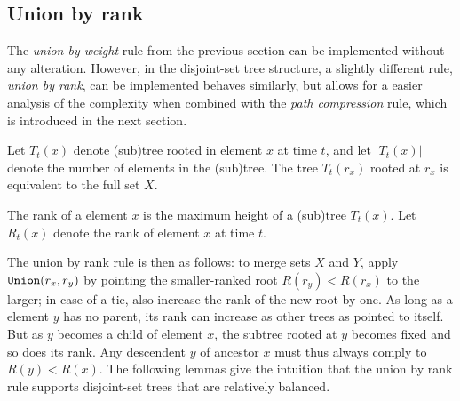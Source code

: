 \subsection{Union by rank}
The \emph{union by weight} rule from the previous section can be implemented without any alteration. However, in the disjoint-set tree structure, a slightly different rule, \emph{union by rank}, can be implemented behaves similarly, but allows for a easier analysis of the complexity when combined with the \emph{path compression} rule, which is introduced in the next section. 

\begin{definition}\label{def:tree}
  Let $T_t(x)$ denote (sub)tree rooted in element $x$ at time $t$, and let $|T_t(x)|$ denote the number of elements in the (sub)tree. The tree $T_t(r_x)$ rooted at $r_x$ is equivalent to the full set $X$.
\end{definition}
\begin{definition}\label{def:rank}
  The rank of a element $x$ is the maximum height of a (sub)tree $T_t(x)$. Let $R_t(x)$ denote the rank of element $x$ at time $t$. 
\end{definition}

The union by rank rule is then as follows: to merge sets $X$ and $Y$, apply $\texttt{Union}(r_x,r_y)$ by pointing the smaller-ranked root $R(r_y) < R(r_x)$ to the larger; in case of a tie, also increase the rank of the new root by one. As long as a element $y$ has no parent, its rank can increase as other trees as pointed to itself. But as $y$ becomes a child of element $x$, the subtree rooted at $y$ becomes fixed and so does its rank. Any descendent $y$ of ancestor $x$ must thus always comply to $R(y)<R(x)$. The following lemmas give the intuition that the union by rank rule supports disjoint-set trees that are relatively balanced.

